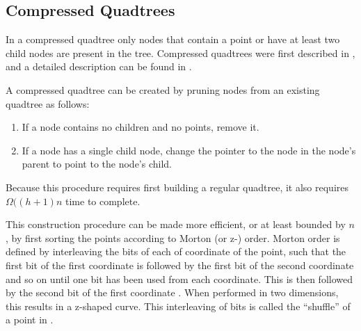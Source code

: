 \documentclass[mcs]{scsthesis}
\begin{document}
\subsection{Compressed Quadtrees}

In a compressed quadtree only nodes that contain a point or have at least two
child nodes are present in the tree. Compressed quadtrees were first described
in \cite{compressedquadtree}, and a detailed description can be found in
\cite{skipquadtree}.

A compressed quadtree can be created by pruning nodes from an existing quadtree
as follows:

\begin{enumerate}
\item If a node contains no children and no points, remove it.
\item If a node has a single child node, change the pointer to the node in the
node's parent to point to the node's child.
\end{enumerate}

Because this procedure requires first building a regular quadtree, it also
requires \(\Omega((h + 1)n\) time to complete.

This construction procedure can be made more efficient, or at least bounded by
\(n\), by first sorting the points according to Morton (or z-) order. Morton order
is defined by interleaving the bits of each of coordinate of the point, such
that the first bit of the first coordinate is followed by the first bit of the
second coordinate and so on until one bit has been used from each coordinate.
This is then followed by the second bit of the first coordinate \cite{morton}.
When performed in two dimensions, this results in a z-shaped curve. This
interleaving of bits is called the ``shuffle'' of a point in \cite{bern}.
\end{document}
